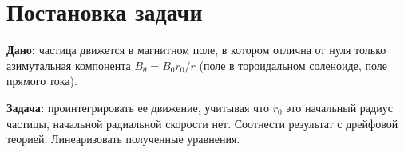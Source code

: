 \section{Постановка задачи}

\textbf{Дано:} частица движется в магнитном поле, в котором отлична от нуля только азимутальная компонента \(B_{\theta} = B_0 r_0 / r\) (поле в тороидальном соленоиде, поле прямого тока).
\par
\textbf{Задача:} проинтегрировать ее движение, учитывая что \(r_0\) это начальный радиус частицы, начальной радиальной скорости нет. Соотнести результат с дрейфовой теорией. Линеаризовать полученные уравнения.
\newpage